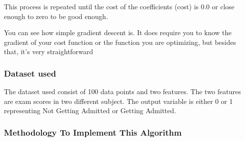 \documentclass[12pt,a4paper]{article}
\begin{document}
\quad This process is repeated until the cost of the coefficients (cost) is 0.0 or close enough to zero to be good enough. 

\quad You can see how simple gradient descent is. It does require you to know the gradient of your cost function or the function you are optimizing, but besides that, it’s very straightforward 


\subsubsection{Dataset used}
\quad \quad The dataset used consist of 100 data points and two features. The two features are exam scores in two different subject. The output variable is either 0 or 1 representing Not Getting Admitted or Getting Admitted.
\subsubsection{Methodology To Implement This Algorithm}
\end{document}
